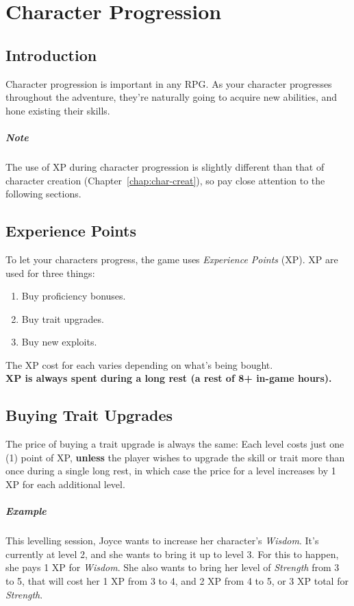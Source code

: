 \chapter{Character Progression}\label{chap:char-prog}
\section{Introduction}
Character progression is important in any RPG.
As your character progresses throughout the adventure, they're naturally going to acquire new abilities, and hone existing their skills.

\paragraph{Note} The use of XP during character progression is slightly different than that of character creation (Chapter~\ref{chap:char-creat}), so pay close attention to the following sections.

\section{Experience Points}
To let your characters progress, the game uses \textit{Experience Points} (XP).
XP are used for three things:
\begin{enumerate}
\item Buy proficiency bonuses.
\item Buy trait upgrades.
\item Buy new exploits.
\end{enumerate}
The XP cost for each varies depending on what's being bought.\\
\textbf{XP is always spent during a long rest (a rest of 8+ in-game hours).}

\section{Buying Trait Upgrades}
The price of buying a trait upgrade is always the same:
Each level costs just one (1) point of XP, \textbf{unless} the player wishes to upgrade the skill or trait more than once during a single long rest, in which case the price for a level increases by 1 XP for each additional level.

\paragraph{Example} This levelling session, Joyce wants to increase her character's \textit{Wisdom}. 
It's currently at level 2, and she wants to bring it up to level 3.
For this to happen, she pays 1 XP for \textit{Wisdom}.
She also wants to bring her level of \textit{Strength} from 3 to 5, that will cost her 1 XP from 3 to 4, and 2 XP from 4 to 5, or 3 XP total for \textit{Strength}.

